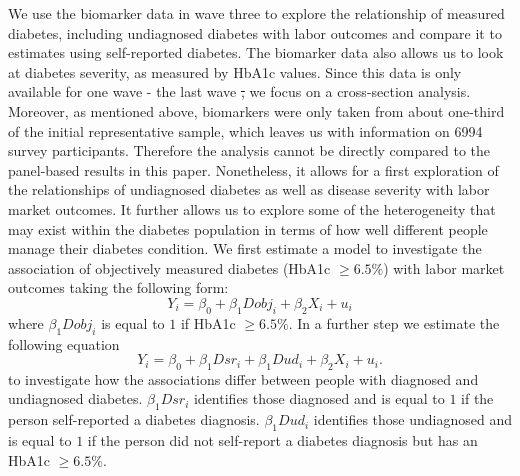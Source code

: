 \documentclass[12pt,english,british]{article}
\providecommand{\DIFaddtex}[1]{{\protect\color{blue}\uwave{#1}}} %
\providecommand{\DIFdeltex}[1]{{\protect\color{red}\sout{#1}}}                      %
\providecommand{\DIFaddbegin}{} %
\providecommand{\DIFaddend}{} %
\providecommand{\DIFdelbegin}{} %
\providecommand{\DIFdelend}{} %
\providecommand{\DIFadd}[1]{\texorpdfstring{\DIFaddtex{#1}}{#1}} %
\providecommand{\DIFdel}[1]{\texorpdfstring{\DIFdeltex{#1}}{}} %
\begin{document}
We use the biomarker data in wave three to explore the relationship of measured diabetes, including undiagnosed diabetes with labor outcomes and compare it to estimates using self-reported diabetes. The biomarker data also allows us to look at diabetes severity, as measured
by \ac{HbA1c} values. Since this data is only available for one wave - the
last wave \DIFdelbegin \DIFdel{, }\DIFdelend \DIFaddbegin \DIFadd{- }\DIFaddend we focus on a cross-section analysis. Moreover,
as mentioned above, biomarkers were only taken from about one-third  of the initial representative sample, which leaves
us with information on 6994 survey participants. Therefore the analysis
cannot be directly compared to the panel-based results in this paper.
Nonetheless, it allows for a first exploration of the relationships
of undiagnosed diabetes as well as disease severity with labor market
outcomes.  It further allows us to explore
some of the heterogeneity that may exist within the diabetes population
in terms of how well different people manage their diabetes condition.
We first estimate a model to investigate the association of objectively
measured diabetes (HbA1c $\geq6.5\%$) with labor market outcomes
taking the following form: 
\begin{equation}
Y_{i}=\beta_{0}+\beta_{1}Dobj_{i}+\beta_{2}X_{i}+u_{i}\label{eq:diab_objective}
\end{equation}
where $\beta_{1}Dobj_{i}$ is equal to $1$ if HbA1c $\geq6.5\%$.
In a further step we estimate the following equation 
\begin{equation}
Y_{i}=\beta_{0}+\beta_{1}Dsr_{i}+\beta_{1}Dud_{i}+\beta_{2}X_{i}+u_{i}.\label{eq:diab_sr_ud}
\end{equation}
to investigate how the associations differ between people with diagnosed
and undiagnosed diabetes. $\beta_{1}Dsr_{i}$ identifies those diagnosed
and is equal to $1$ if the person self-reported a diabetes diagnosis.
$\beta_{1}Dud_{i}$ identifies those undiagnosed and is equal to $1$
if the person did not self-report a diabetes diagnosis but has an
HbA1c $\geq6.5\%$.
\end{document}
